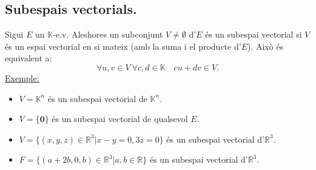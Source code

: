 \documentclass[11pt]{article}
\newcommand{\fieldk}{\mathbb{K}}
\newcommand{\ex}{\underline{Exemple:}}
\begin{document}
\subsection{Subespais vectorials.}
Sigui $E$ un $\fieldk$-e.v. Aleshores un subconjunt $V\neq\emptyset$ d'$E$ és un subespai vectorial si $V$ és un espai vectorial en si mateix (amb la suma i el producte d'$E$). Això és equivalent a:
$$\forall u,v\in V \ \forall c,d\in\fieldk \quad cu+dv\in V.$$
\ex \begin{itemize}
	\item $V=\fieldk^n$ és un subespai vectorial de $\fieldk^n$.
	\item $V=\{\textbf{0}\}$ és un subespai vectorial de qualsevol $E$.
	\item $V=\{(x,y,z)\in\mathbb{R}^3|x-y=0,3z=0\}$ és un subespai vectorial d'$\mathbb{R}^3$.
	\item $F=\{(a+2b,0,b)\in\mathbb{R}^3|a,b\in\mathbb{R}\}$ és un subespai vectorial d'$\mathbb{R}^3$.
\end{itemize}
\end{document}
